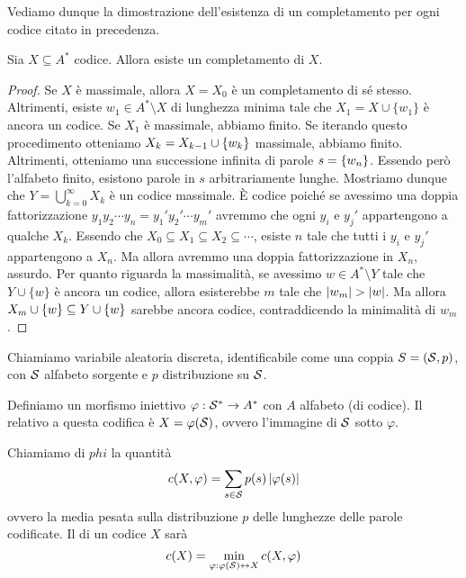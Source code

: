 Vediamo dunque la dimostrazione dell'esistenza di un completamento per ogni codice citato in precedenza.
\begin{proposition}
  Sia \(X \subseteq A^*\) codice. Allora esiste un completamento di \(X\).
\end{proposition}
\begin{proof}
  Se \(X\) è massimale, allora \(X = X_0\) è un completamento di sé stesso.
  Altrimenti, esiste \(w_1 \in A^*\setminus X\) di lunghezza minima tale che \(X_1 = X \cup \{w_1\}\) è ancora un codice.
  Se \(X_1\) è massimale, abbiamo finito.
  Se iterando questo procedimento otteniamo \(X_k = X_{k-1} \cup \set{w_k}\) massimale, abbiamo finito.
  Altrimenti, otteniamo una successione infinita di parole \(s = \set{w_n}\). Essendo però l'alfabeto finito, esistono parole in \(s\) arbitrariamente lunghe.
  Mostriamo dunque che \(Y = \bigcup_{k = 0}^{\infty} X_k\) è un codice massimale.
  È codice poiché se avessimo una doppia fattorizzazione \(y_1 y_2 \cdots y_n = y_1' y_2' \cdots y_m'\) avremmo che ogni \(y_i\) e \(y_j'\) appartengono a qualche \(X_k\). Essendo che \(X_0 \subseteq X_1 \subseteq X_2 \subseteq \cdots\), esiste \(n\) tale che tutti i \(y_i\) e \(y_j'\) appartengono a \(X_n\). Ma allora avremmo una doppia fattorizzazione in \(X_n\), assurdo.
  Per quanto riguarda la massimalità, se avessimo \(w \in A^* \setminus Y\) tale che \(Y \cup \{w\}\) è ancora un codice, allora esisterebbe \(m\) tale che \(\left|w_m\right| > \left|w\right|\).
  Ma allora \(X_m \cup \set{w}\subseteq Y \cup \set{w}\) sarebbe ancora codice, contraddicendo la minimalità di \(w_m\).
\end{proof}

\begin{definition}
  Chiamiamo  variabile aleatoria discreta, identificabile come una coppia \(S = (\mathcal{S},p)\), con \(\mathcal{S}\) alfabeto sorgente e \(p\) distribuzione su \(\mathcal{S}\).
\end{definition}
\begin{definition}[Codifica]
  Definiamo  un morfismo iniettivo \(\varphi: \mathcal{S}^* \to A^*\) con \(A\) alfabeto (di codice).
  Il  relativo a questa codifica è \(X = \varphi(\mathcal{S})\), ovvero l'immagine di \(\mathcal{S}\) sotto \(\varphi\).
\end{definition}
\begin{definition}
  Chiamiamo  di \(phi\) la quantità
  \[c(X,\varphi) = \sum_{s \in \mathcal{S}} p(s) \left|\varphi(s)\right|\]
  ovvero la media pesata sulla distribuzione \(p\) delle lunghezze delle parole codificate.
  Il  di un codice \(X\) sarà
  \[c(X) = \min_{\varphi: \varphi(\mathcal{S}) \leftrightarrow  X} c(X,\varphi)\]
\end{definition}

